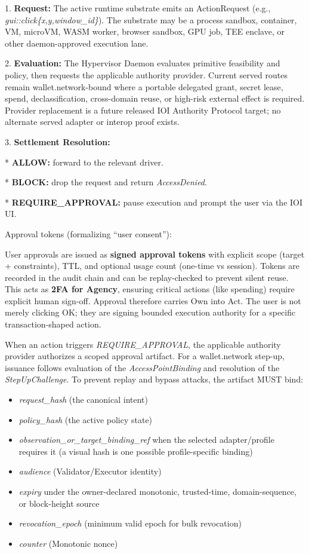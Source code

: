 \documentclass[
  11pt,
]{article}
\providecommand{\tightlist}{%
  \setlength{\itemsep}{0pt}\setlength{\parskip}{0pt}}
\begin{document}
1. \textbf{Request:} The active runtime substrate emits an
ActionRequest (e.g., \emph{gui::click\{x,y,window\_id\}}). The
substrate may be a process sandbox, container, VM, microVM, WASM worker,
browser sandbox, GPU job, TEE enclave, or other daemon-approved
execution lane.

2. \textbf{Evaluation:} The Hypervisor Daemon evaluates primitive
feasibility and policy, then requests the applicable authority provider.
Current served routes remain wallet.network-bound where a portable delegated
grant, secret lease, spend, declassification, cross-domain reuse, or high-risk
external effect is required. Provider replacement is a future released IOI
Authority Protocol target; no alternate served adapter or interop proof exists.

3. \textbf{Settlement Resolution:}

* \textbf{ALLOW: }forward to the relevant driver.

* \textbf{BLOCK:} drop the request and return \emph{AccessDenied}.

* \textbf{REQUIRE\_APPROVAL:} pause execution and prompt the user via
the IOI UI.

Approval tokens (formalizing ``user consent''):

User approvals are issued as \textbf{signed approval tokens} with
explicit scope (target + constraints), TTL, and optional usage count
(one-time vs session). Tokens are recorded in the audit chain and can be
replay-checked to prevent silent reuse. This acts as \textbf{2FA for
Agency}, ensuring critical actions (like spending) require explicit
human sign-off. Approval therefore carries Own into Act. The user is not
merely clicking OK; they are signing bounded execution authority for a
specific transaction-shaped action.

\hfill\break
When an action triggers \emph{REQUIRE\_APPROVAL}, the
applicable authority provider authorizes a scoped approval artifact. For a
wallet.network step-up, issuance follows evaluation of the
\emph{AccessPointBinding} and resolution of the \emph{StepUpChallenge}. To
prevent replay and bypass attacks, the artifact MUST bind:

\begin{itemize}
\tightlist
\item
  \emph{request\_hash} (the canonical intent)
\item
  \emph{policy\_hash} (the active policy state)
\item
  \emph{observation\_or\_target\_binding\_ref} when the selected adapter/profile
  requires it (a visual hash is one possible profile-specific binding)
\item
  \emph{audience} (Validator/Executor identity)
\item
  \emph{expiry} under the owner-declared monotonic, trusted-time, domain-sequence,
  or block-height source
\item
  \emph{revocation\_epoch} (minimum valid epoch for bulk revocation)
\item
  \emph{counter} (Monotonic nonce)
\end{itemize}
\end{document}
